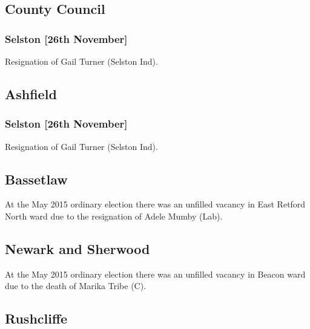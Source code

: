 \documentclass[a4paper,openany]{book}
\begin{document}
\begin{resultsiii}
\subsection*{County Council}

\subsubsection*{Selston \hspace*{\fill}\nolinebreak[1]%
\enspace\hspace*{\fill}
[26th November]}


Resignation of Gail Turner (Selston Ind).

\subsection*{Ashfield}

\subsubsection*{Selston \hspace*{\fill}\nolinebreak[1]%
\enspace\hspace*{\fill}
[26th November]}


Resignation of Gail Turner (Selston Ind).

\subsection*{Bassetlaw}

At the May 2015 ordinary election there was an unfilled vacancy in East Retford North ward due to the resignation of Adele Mumby (Lab).

\subsection*{Newark and Sherwood}

At the May 2015 ordinary election there was an unfilled vacancy in Beacon ward due to the death of Marika Tribe (C).

\subsection*{Rushcliffe}


\end{resultsiii}
\end{document}
